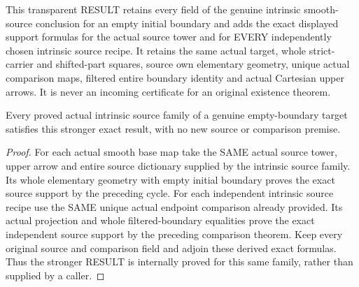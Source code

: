 \begin{definition}
\label{hir:original-nonpure-exact-empty-smooth-source-result}
This transparent RESULT retains every field of the genuine intrinsic
smooth-source conclusion for an empty initial boundary and adds the
exact displayed support formulas for the actual source tower and for
EVERY independently chosen intrinsic source recipe. It retains the
same actual target, whole strict-carrier and shifted-part squares,
source own elementary geometry, unique actual comparison maps,
filtered entire boundary identity and actual Cartesian upper arrows.
It is never an incoming certificate for an original existence theorem.
\leanok
\end{definition}

\begin{theorem}
\label{hir:original-nonpure-exact-empty-smooth-source-producer}
Every proved actual intrinsic source family of a genuine empty-boundary
target satisfies this stronger exact result, with no new source or
comparison premise.
\leanok
\end{theorem}
\begin{proof}
For each actual smooth base map take the SAME actual source tower,
upper arrow and entire source dictionary supplied by the intrinsic
source family. Its whole elementary geometry with empty initial
boundary proves the exact source support by the preceding cycle.
For each independent intrinsic source recipe use the SAME unique
actual endpoint comparison already provided. Its actual projection
and whole filtered-boundary equalities prove the exact independent
source support by the preceding comparison theorem. Keep every
original source and comparison field and adjoin these derived exact
formulas. Thus the stronger RESULT is internally proved for this
same family, rather than supplied by a caller.
\end{proof}

